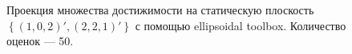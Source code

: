 \documentclass[10pt, a4paper]{article}
\begin{document}
\begin{figure}[H]
\caption{Проекция множества достижимости на статическую плоскость $\left\{(1,0,2)',(2,2,1)'\right\}$ с помощью ellipsoidal toolbox. Количество оценок --- 50.}
\end{figure}
\end{document}
